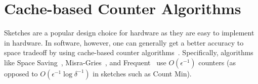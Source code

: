 \section{Cache-based Counter Algorithms}
\label{sec:CBA}
Sketches are a popular design choice for hardware as they are easy to implement in hardware.
In software, however, one can generally get a better accuracy to space tradeoff by using cache-based counter algorithms~\cite{SpaceSavingIsTheBest2010,SpaceSavingIsTheBest2011}. Specifically, algorithms like Space Saving~\cite{SpaceSavings}, Misra-Gries~\cite{misra1982finding}, and Frequent~\cite{BatchDecrement,frequent4} use $O(\epsilon^{-1})$ counters (as opposed to $O(\epsilon^{-1}\log\delta^{-1})$ in sketches such as Count Min). %


